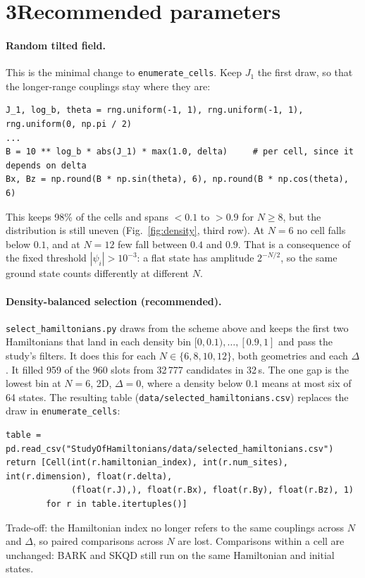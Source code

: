 \documentclass[10pt,a4paper]{article}
\begin{document}
\section*{3\quad Recommended parameters}
\paragraph{Random tilted field.} This is the minimal change to \texttt{enumerate\_cells}. Keep $J_1$ the first draw,
so that the longer-range couplings stay where they are:
\begin{lstlisting}
J_1, log_b, theta = rng.uniform(-1, 1), rng.uniform(-1, 1), rng.uniform(0, np.pi / 2)
...
B = 10 ** log_b * abs(J_1) * max(1.0, delta)     # per cell, since it depends on delta
Bx, Bz = np.round(B * np.sin(theta), 6), np.round(B * np.cos(theta), 6)
\end{lstlisting}
This keeps 98\% of the cells and spans $<0.1$ to $>0.9$ for $N\ge8$, but the distribution is still uneven
(Fig.~\ref{fig:density}, third row). At $N=6$ no cell falls below $0.1$, and at
$N=12$ few fall between $0.4$ and $0.9$. That is a consequence of the fixed threshold
$|\psi_i|>10^{-3}$: a flat state has amplitude $2^{-N/2}$, so the same ground state counts
differently at different $N$.

\paragraph{Density-balanced selection (recommended).} \texttt{select\_hamiltonians.py} draws
from the scheme above and keeps the first two Hamiltonians that land in each density bin
$[0,0.1),\dots,[0.9,1]$ and pass the study's filters. It does this for each $N\in\{6,8,10,12\}$, both geometries
and each $\Delta$. It filled 959 of the 960 slots from 32\,777 candidates in 32\,s. The one gap is
the lowest bin at $N=6$, 2D, $\Delta=0$, where a density below $0.1$ means at most six of 64
states. The resulting table (\texttt{data/selected\_hamiltonians.csv}) replaces the draw in
\texttt{enumerate\_cells}:
\noindent\begin{minipage}{\linewidth}
\begin{lstlisting}
table = pd.read_csv("StudyOfHamiltonians/data/selected_hamiltonians.csv")
return [Cell(int(r.hamiltonian_index), int(r.num_sites), int(r.dimension), float(r.delta),
             (float(r.J),), float(r.Bx), float(r.By), float(r.Bz), 1)
        for r in table.itertuples()]
\end{lstlisting}
\end{minipage}
Trade-off: the Hamiltonian index no longer refers to the same couplings across $N$ and $\Delta$,
so paired comparisons across $N$ are lost. Comparisons within a cell are unchanged: BARK and SKQD
still run on the same Hamiltonian and initial states.
\end{document}
